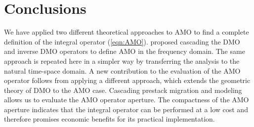 \section{Conclusions}

We have applied two different theoretical approaches to AMO to find a
complete definition of the integral operator
(\ref{eqn:AMO}). \cite{Biondi.sep.80.125} proposed cascading the DMO
and inverse DMO operators to define AMO in the frequency domain. The
same approach is repeated here in a simpler way by transferring the
analysis to the natural time-space domain. A new contribution to the
evaluation of the AMO operator follows from applying a different
approach, which extends the geometric theory of DMO
\cite[]{GPR29-03-03740406} to the AMO case. Cascading prestack
migration and modeling allows us to evaluate the AMO operator aperture.
The compactness of the AMO aperture indicates that the integral operator can be
performed at a low cost and therefore
promises economic benefits for its practical implementation.



\appendix
